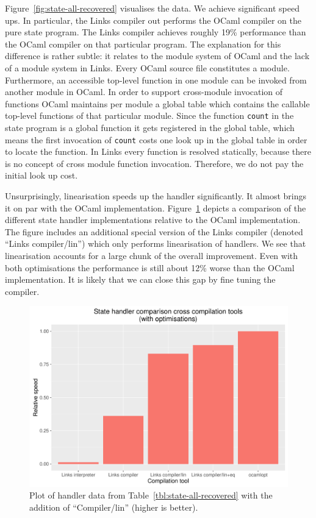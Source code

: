 \documentclass[12pt,mscres,cdtppar,twoside,openright,logo,rightchapter,normalheadings]{infthesis}
\theoremstyle{definition}
\begin{document}
Figure~\ref{fig:state-all-recovered} visualises the data. We achieve
significant speed ups. In particular, the Links compiler out performs
the OCaml compiler on the pure state program. The Links compiler
achieves roughly 19\% performance than the OCaml compiler on that
particular program. The explanation for this difference is rather
subtle: it relates to the module system of OCaml and the lack of a
module system in Links. Every OCaml source file constitutes a
module. Furthermore, an accessible top-level function in one module
can be invoked from another module in OCaml. In order to support
cross-module invocation of functions OCaml maintains per module a
global table which contains the callable top-level functions of that
particular module. Since the function \lstinline$count$ in the state
program is a global function it gets registered in the global table,
which means the first invocation of \lstinline$count$ costs one look
up in the global table in order to locate the function. In Links every
function is resolved statically, because there is no concept of cross
module function invocation. Therefore, we do not pay the initial look
up cost.

Unsurprisingly, linearisation speeds up the handler significantly. It
almost brings it on par with the OCaml
implementation. Figure~\ref{fig:statehandler-all} depicts a comparison
of the different state handler implementations relative to the OCaml
implementation. The figure includes an additional special version of
the Links compiler (denoted ``Links compiler/lin'') which only
performs linearisation of handlers. We see that linearisation accounts
for a large chunk of the overall improvement. Even with both
optimisations the performance is still about 12\% worse than the OCaml
implementation. It is likely that we can close this gap by fine tuning
the compiler.

\begin{figure}[H]
\centering
\includegraphics[scale=0.6]{plots/statehandlerAll.pdf}
\caption{Plot of handler data from Table~\ref{tbl:state-all-recovered}
  with the addition of ``Compiler/lin'' (higher is
  better).}\label{fig:statehandler-all}
\end{figure}
\end{document}
